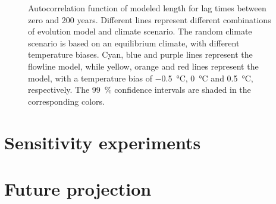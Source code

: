 \begin{figure}[htp]
\begin{subfigure}[b]{0.48\textwidth}
        \end{subfigure}

        \caption{Autocorrelation function of modeled length for lag times between zero and 200 years. Different lines represent different combinations of evolution model and climate scenario.
        The random climate scenario is based on an equilibrium climate, with different temperature biases.
        Cyan, blue and purple lines represent the flowline model, while yellow, orange and red lines represent the \vas{} model, with a temperature bias of \SI{-.5}{\celsius}, \SI{0}{\celsius} and \SI{+.5}{\celsius}, respectively.
        The \SI{99}{\percent} confidence intervals are shaded in the corresponding colors.}
        \label{fig:acf}
      \end{figure}
    


\section{Sensitivity experiments} %
\label{sec:sensitivity_experiments_results}


\section{Future projection} %
\label{sec:future_projection_results}

